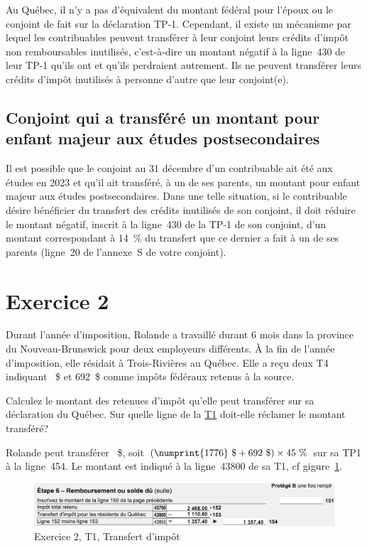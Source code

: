 Au Québec, il n'y a pas d'équivalent du montant fédéral pour l'époux ou le conjoint de fait sur la déclaration TP-1. Cependant, il existe un mécanisme par lequel les contribuables peuvent transférer à leur conjoint leurs crédits d'impôt non remboursables inutilisés, c'est-à-dire un montant négatif à la ligne~430 de leur TP-1 qu'ils ont et qu'ils perdraient autrement. Ils ne peuvent transférer leurs crédits d'impôt inutilisés à personne d'autre que leur conjoint(e).


\subsection{Conjoint qui a transféré un montant pour enfant majeur aux études postsecondaires}
Il est possible que le conjoint au 31 décembre d'un contribuable ait été aux études en 2023 et qu'il ait transféré, à un de ses parents, un montant pour enfant majeur aux études postsecondaires. Dans une telle situation, si le contribuable désire bénéficier du transfert des crédits inutilisés de son conjoint, il doit réduire le montant négatif, inscrit à la ligne~430 de la TP-1 de son conjoint, d'un montant correspondant à 14~\% du transfert que ce dernier a fait à un de ses parents (ligne~20 de l'annexe~S de votre conjoint).




\section{Exercice 2}
\setcounter{question}{0}
\begin{question}
	Durant l'année d'imposition, Rolande a travaillé durant 6 mois dans la province du Nouveau-Brunswick pour deux employeurs différents. À la fin de l'année d'imposition, elle résidait à Trois-Rivières au Québec. Elle a reçu deux T4 indiquant ~\$ et 692~\$ comme impôts fédéraux retenus à la source. 
	
	Calculez le montant des retenues d'impôt qu'elle peut transférer sur sa déclaration du Québec. Sur quelle ligne de la \href{https://www.canada.ca/fr/agence-revenu/services/formulaires-publications/trousses-impot-toutes-annees-imposition/trousse-generale-impot-prestations/quebec/5005-r.html}{T1} doit-elle réclamer le montant transféré?
\end{question}
Rolande peut transférer ~\$, soit \((\numprint{1776}~\$ + 692~\$) \times 45~\% \) sur sa TP1 à la ligne~454. Le montant est indiqué à la ligne~43800 de sa T1, cf gigure~\ref{fig:chap5Exercice2Q1}.
\begin{figure}
	\centering
	\includegraphics[width=.9\textwidth]{exercice/5-2/Q1/T1-6.png}
	\caption[]{Exercice 2, T1, Transfert d'impôt}
	\label{fig:chap5Exercice2Q1}
\end{figure}

